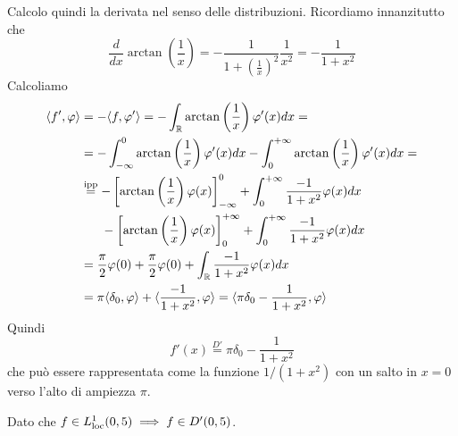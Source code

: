 Calcolo quindi la derivata nel senso delle distribuzioni. Ricordiamo innanzitutto che
\begin{equation*}
\frac{d}{dx}\arctan\left(\frac{1}{x}\right) = - \frac{1}{1 + \left(\frac{1}{x}\right)^{2}}\frac{1}{x^{2}} = - \frac{1}{1 + x^{2}}
\end{equation*}
Calcoliamo
\begin{align*}
\langle f',\varphi \rangle  & = - \langle f,\varphi '\rangle = - \int _{\mathbb{R} }\arctan\left(\frac{1}{x}\right) \varphi '(x)dx = \\
 & = - \int ^{0}_{ - \infty }\arctan\left(\frac{1}{x}\right) \varphi '(x)dx - \int ^{ + \infty }_{0}\arctan\left(\frac{1}{x}\right) \varphi '(x)dx = \\
 & \overset{\text{ipp}}{ = } - \left[\arctan\left(\frac{1}{x}\right) \varphi (x)\right]^{0}_{ - \infty } + \int ^{ + \infty }_{0}\frac{ - 1}{1 + x^{2}} \varphi (x) dx\\
 & \ \ \ \ \ - \left[\arctan\left(\frac{1}{x}\right) \varphi (x)\right]^{ + \infty }_{0} + \int ^{ + \infty }_{0}\frac{ - 1}{1 + x^{2}} \varphi (x) dx\\
 & = \frac{\pi }{2} \varphi (0) + \frac{\pi }{2} \varphi (0) + \int _{\mathbb{R} }\frac{ - 1}{1 + x^{2}} \varphi (x)dx\\
 & = \pi \langle \delta _{0} ,\varphi \rangle + \langle \frac{ - 1}{1 + x^{2}} ,\varphi \rangle = \langle \pi \delta _{0} - \frac{1}{1 + x^{2}} ,\varphi \rangle 
\end{align*}
Quindi
\begin{equation*}
f'(x)\overset{D'}{ = } \pi \delta _{0} - \frac{1}{1 + x^{2}}
\end{equation*}
che può essere rappresentata come la funzione $1/\left(1 + x^{2}\right)$ con un salto in $x = 0$ verso l'alto di ampiezza $\pi $.
\Soluzione

Dato che $f\in L^{1}_{\operatorname{loc}} (0,5)\implies f\in D'(0,5)$.



